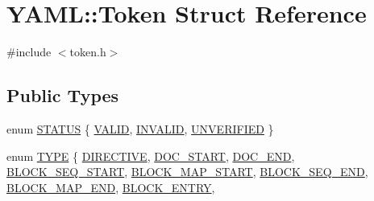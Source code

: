 \hypertarget{struct_y_a_m_l_1_1_token}{}\section{Y\+A\+ML\+::Token Struct Reference}
\label{struct_y_a_m_l_1_1_token}


{\ttfamily \#include $<$token.\+h$>$}

\subsection*{Public Types}
\begin{DoxyCompactItemize}
\item 
enum \mbox{\hyperlink{struct_y_a_m_l_1_1_token_af37af1a3129a5f1c36f08d41f668f7e5}{S\+T\+A\+T\+US}} \{ \mbox{\hyperlink{struct_y_a_m_l_1_1_token_af37af1a3129a5f1c36f08d41f668f7e5a31a1f1c77031ef02257845680298d02b}{V\+A\+L\+ID}}, 
\mbox{\hyperlink{struct_y_a_m_l_1_1_token_af37af1a3129a5f1c36f08d41f668f7e5a4922ef1ede10671caec1755ae423fa42}{I\+N\+V\+A\+L\+ID}}, 
\mbox{\hyperlink{struct_y_a_m_l_1_1_token_af37af1a3129a5f1c36f08d41f668f7e5a1e411ae78745f3c865c9fadcd2ef7bf1}{U\+N\+V\+E\+R\+I\+F\+I\+ED}}
 \}
\item 
enum \mbox{\hyperlink{struct_y_a_m_l_1_1_token_a60bcc6615b60f00ae9bce3aaeebf6d14}{T\+Y\+PE}} \{ \newline
\mbox{\hyperlink{struct_y_a_m_l_1_1_token_a60bcc6615b60f00ae9bce3aaeebf6d14ace8938d900653e3989c4d25f815b9065}{D\+I\+R\+E\+C\+T\+I\+VE}}, 
\mbox{\hyperlink{struct_y_a_m_l_1_1_token_a60bcc6615b60f00ae9bce3aaeebf6d14a9994af7e78c14fedaa12fde86afcc078}{D\+O\+C\+\_\+\+S\+T\+A\+RT}}, 
\mbox{\hyperlink{struct_y_a_m_l_1_1_token_a60bcc6615b60f00ae9bce3aaeebf6d14a01237441381b11b0fe1c13fc6d8ab124}{D\+O\+C\+\_\+\+E\+ND}}, 
\mbox{\hyperlink{struct_y_a_m_l_1_1_token_a60bcc6615b60f00ae9bce3aaeebf6d14a39ddd967e839945abaf0635717500ef3}{B\+L\+O\+C\+K\+\_\+\+S\+E\+Q\+\_\+\+S\+T\+A\+RT}}, 
\newline
\mbox{\hyperlink{struct_y_a_m_l_1_1_token_a60bcc6615b60f00ae9bce3aaeebf6d14ae3ec9e625c71bd59b379fca4d24e5a3a}{B\+L\+O\+C\+K\+\_\+\+M\+A\+P\+\_\+\+S\+T\+A\+RT}}, 
\mbox{\hyperlink{struct_y_a_m_l_1_1_token_a60bcc6615b60f00ae9bce3aaeebf6d14a1ded63235cc1fbb446c6ce302ae10f06}{B\+L\+O\+C\+K\+\_\+\+S\+E\+Q\+\_\+\+E\+ND}}, 
\mbox{\hyperlink{struct_y_a_m_l_1_1_token_a60bcc6615b60f00ae9bce3aaeebf6d14a6086d425f7bd70ec4366f490f1d7da30}{B\+L\+O\+C\+K\+\_\+\+M\+A\+P\+\_\+\+E\+ND}}, 
\mbox{\hyperlink{struct_y_a_m_l_1_1_token_a60bcc6615b60f00ae9bce3aaeebf6d14a08420a33254ad0b921fd174d893a4aca}{B\+L\+O\+C\+K\+\_\+\+E\+N\+T\+RY}}, 

\end{DoxyCompactItemize}
